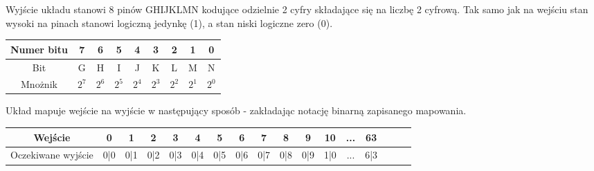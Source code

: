 \documentclass[a4paper]{article}
\begin{document}
Wyjście układu stanowi 8 pinów GHIJKLMN kodujące odzielnie 2 cyfry składające się na liczbę 2 cyfrową. Tak samo jak na wejściu stan wysoki na pinach
stanowi logiczną jedynkę (1), a stan niski logiczne zero (0). 
\begin{center}
  \begin{tabular}{|c|c|c|c|c|c|c|c|c|}
    \hline Numer bitu & 7 & 6 & 5 & 4 & 3 & 2 & 1 & 0 \\ 
    \hline Bit & G & H & I & J & K & L & M & N \\
    \hline Mnożnik & $2^7$ & $2^6$ & $2^5$ & $2^4$ & $2^3$ & $2^2$ & $2^1$ & $2^0$ \\
    \hline
  \end{tabular}
\end{center}

Układ mapuje wejście na wyjście w następujący sposób - zakładając notację binarną zapisanego mapowania.

\begin{center}
  \begin{tabular}{|c|c|c|c|c|c|c|c|c|c|c|c|c|c|c|c|c|}
  \hline Wejście & 0 & 1 & 2 & 3 & 4 & 5 & 6 & 7 & 8 & 9 & 10 & ... & 63 \\
  \hline Oczekiwane wyjście & 0|0 & 0|1 & 0|2 & 0|3 & 0|4 & 0|5 & 0|6 & 0|7 & 0|8 & 0|9 & 1|0 & ... & 6|3 \\
  \hline
  \end{tabular}
  \end{center}

\pagebreak
\end{document}

